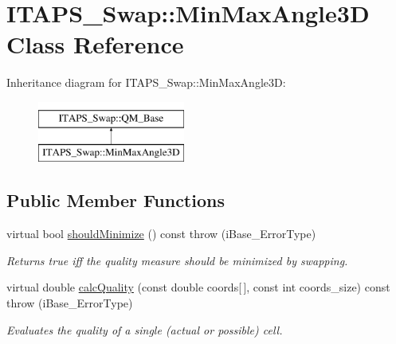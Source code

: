\hypertarget{class_i_t_a_p_s___swap_1_1_min_max_angle3_d}{
\section{ITAPS\_\-Swap::MinMaxAngle3D Class Reference}
\label{class_i_t_a_p_s___swap_1_1_min_max_angle3_d}
}
Inheritance diagram for ITAPS\_\-Swap::MinMaxAngle3D:\begin{figure}[H]
\begin{center}
\leavevmode
\includegraphics[height=2cm]{class_i_t_a_p_s___swap_1_1_min_max_angle3_d}
\end{center}
\end{figure}
\subsection*{Public Member Functions}
\begin{DoxyCompactItemize}
\item 
\hypertarget{class_i_t_a_p_s___swap_1_1_min_max_angle3_d_a6b564f9cc2b7e79a5358dbfefc48c41c}{
virtual bool \hyperlink{class_i_t_a_p_s___swap_1_1_min_max_angle3_d_a6b564f9cc2b7e79a5358dbfefc48c41c}{shouldMinimize} () const   throw (iBase\_\-ErrorType)}
\label{class_i_t_a_p_s___swap_1_1_min_max_angle3_d_a6b564f9cc2b7e79a5358dbfefc48c41c}

\begin{DoxyCompactList}\small\item\em Returns true iff the quality measure should be minimized by swapping. \item\end{DoxyCompactList}\item 
virtual double \hyperlink{class_i_t_a_p_s___swap_1_1_min_max_angle3_d_acad0f614af36012501c3aee66c0e85ea}{calcQuality} (const double coords\mbox{[}$\,$\mbox{]}, const int coords\_\-size) const   throw (iBase\_\-ErrorType)
\begin{DoxyCompactList}\small\item\em Evaluates the quality of a single (actual or possible) cell. \item\end{DoxyCompactList}\end{DoxyCompactItemize}


